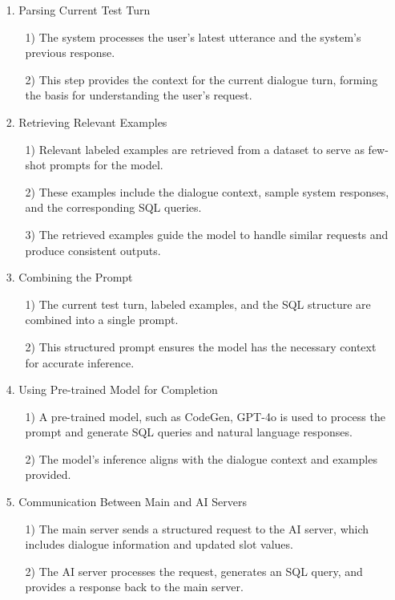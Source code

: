 \documentclass[conference]{IEEEtran}
\begin{document}
\begin{enumerate}
    \item[1.] Parsing Current Test Turn
    \begin{itemize}
    \item[1)] The system processes the user's latest utterance and the system's previous response.
    \item[2)] This step provides the context for the current dialogue turn, forming the basis for understanding the user's request. \\
    \end{itemize} 

\item[2.] Retrieving Relevant Examples
\begin{itemize}
    \item[1)] Relevant labeled examples are retrieved from a dataset to serve as few-shot prompts for the model.
    \item[2)] These examples include the dialogue context, sample system responses, and the corresponding SQL queries.
    \item[3)] The retrieved examples guide the model to handle similar requests and produce consistent outputs. \\
\end{itemize} 

\item[3.] Combining the Prompt
\begin{itemize}
    \item[1)] The current test turn, labeled examples, and the SQL structure are combined into a single prompt.
    \item[2)] This structured prompt ensures the model has the necessary context for accurate inference. \\
\end{itemize} 

\item[4.] Using Pre-trained Model for Completion
\begin{itemize}
    \item[1)] A pre-trained model, such as CodeGen, GPT-4o is used to process the prompt and generate SQL queries and natural language responses.
    \item[2)] The model's inference aligns with the dialogue context and examples provided. \\
\end{itemize} 

\item[5.] Communication Between Main and AI Servers
\begin{itemize}
    \item[1)] The main server sends a structured request to the AI server, which includes dialogue information and updated slot values.
    \item[2)] The AI server processes the request, generates an SQL query, and provides a response back to the main server.
\end{itemize} 
\end{enumerate}
\end{document}
